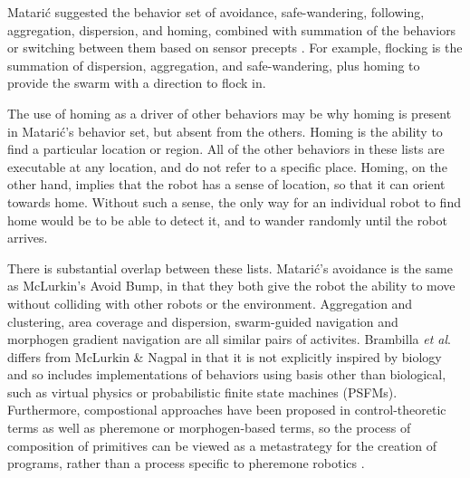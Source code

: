 \documentclass[]{article}
\begin{document}
Matari\'c suggested the behavior set of avoidance, safe-wandering, following, aggregation, dispersion, and homing, combined with summation of the behaviors or switching between them based on sensor precepts \cite{mataric1995designing}. For example, flocking is the summation of dispersion, aggregation, and safe-wandering, plus homing to provide the swarm with a direction to flock in. 

The use of homing as a driver of other behaviors may be why homing is present in Matari\'c's behavior set, but absent from the others. 
Homing is the ability to find a particular location or region. 
All of the other behaviors in these lists are executable at any location, and do not refer to a specific place. 
Homing, on the other hand, implies that the robot has a sense of location, so that it can orient towards home. 
Without such a sense, the only way for an individual robot to find home would be to be able to detect it, and to wander randomly until the robot arrives. 

There is substantial overlap between these lists. Matari\'c's avoidance is the same as McLurkin's Avoid Bump, in that they both give the robot the ability to move without colliding with other robots or the environment. 
Aggregation and clustering, area coverage and dispersion, swarm-guided navigation and morphogen gradient navigation are all similar pairs of activites. 
Brambilla \textit{et al}. differs from McLurkin \& Nagpal in that it is not explicitly inspired by biology and so includes implementations of behaviors using basis other than biological, such as virtual physics or probabilistic finite state machines (PSFMs). 
Furthermore, compostional approaches have been proposed in control-theoretic terms as well as pheremone or morphogen-based terms, so the process of composition of primitives can be viewed as a metastrategy for the creation of programs, rather than a process specific to pheremone robotics \cite{belta2007symbolic}.
\end{document}
